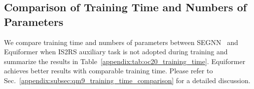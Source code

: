 \begin{table}[t]
\begin{adjustwidth}{0cm}{0cm}
\centering
{}
\end{adjustwidth}
\vspace{-2mm}
\caption{\textbf{Ablation study of $SE(3)$/$E(3)$ equivariance on OC20 IS2RE \underline{validation} set.}
``Equiformer'' operates on $SE(3)$-equivariant features while ``$E(3)$-Equiformer'' uses $E(3)$-equivariant features.
}
\label{appendix:tab:e3_oc20}
\end{table}


\subsection{Comparison of Training Time and Numbers of Parameters}
\label{appendix:subsec:oc20_training_time_comparison}
We compare training time and numbers of parameters between SEGNN~\citep{segnn} and Equiformer when IS2RS auxiliary task is not adopted during training and summarize the results in Table~\ref{appendix:tab:oc20_training_time}.
Equiformer achieves better results with comparable training time.
Please refer to Sec.~\ref{appendix:subsec:qm9_training_time_comparison} for a detailed discussion.

